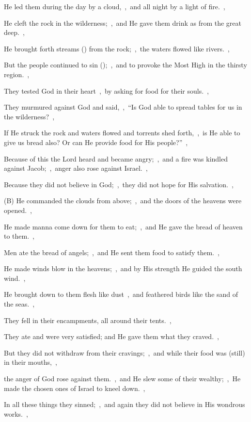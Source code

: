 \documentclass[12pt,twoside,a5paper]{article}
\begin{document}
\begin{halfparskip}
  He led them during the day by a cloud,~\sep\ and all night by a light of fire.~\sep

  He cleft the rock in the wilderness;~\sep\ and He gave them drink as from the great deep.~\sep

  He brought forth streams () from the rock;~\sep\ the waters flowed like rivers.~\sep

  But the people continued to sin ();~\sep\ and to provoke the Most High in the thirsty region.~\sep

  They tested God in their heart~\sep\ by asking for food for their souls.~\sep

  They murmured against God and said,~\sep\ ``Is God able to spread tables for us in the wilderness?~\sep

  If He struck the rock and waters flowed and torrents shed forth,~\sep\ is He able to give us bread also? Or can He provide food for His people?''~\sep

  Because of this the Lord heard and became angry;~\sep\ and a fire was kindled against Jacob;~\sep\ anger also rose against Israel.~\sep

  Because they did not believe in God;~\sep\ they did not hope for His salvation.~\sep

  (B) He commanded the clouds from above;~\sep\ and the doors of the heavens were opened.~\sep

  He made manna come down for them to eat;~\sep\ and He gave the bread of heaven to them.~\sep

  Men ate the bread of angels;~\sep\ and He sent them food to satisfy them.~\sep

  He made winds blow in the heavens;~\sep\ and by His strength He guided the south wind.~\sep

  He brought down to them flesh like dust~\sep\ and feathered birds like the sand of the seas.~\sep

  They fell in their encampments, all around their tents.~\sep

  They ate and were very satisfied; and He gave them what they craved.~\sep

  But they did not withdraw from their cravings;~\sep\ and while their food was (still) in their mouths,~\sep

  the anger of God rose against them.~\sep\ and He slew some of their wealthy;~\sep\ He made the chosen ones of Israel to kneel down.~\sep

  In all these things they sinned;~\sep\ and again they did not believe in His wondrous works.~\sep


\end{halfparskip}
\end{document}

